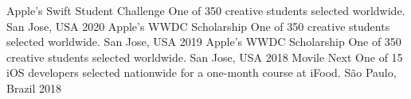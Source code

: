 \begin{cvhonors}
  \cvhonor
    {Apple's Swift Student Challenge}
    {One of 350 creative students selected worldwide.}
    {San Jose, USA}
    {2020}
  \cvhonor
    {Apple's WWDC Scholarship}
    {One of 350 creative students selected worldwide.}
    {San Jose, USA}
    {2019}
  \cvhonor
    {Apple's WWDC Scholarship}
    {One of 350 creative students selected worldwide.}
    {San Jose, USA}
    {2018}
  \cvhonor
    {Movile Next}
    {One of 15 iOS developers selected nationwide for a one-month course at iFood.}
    {São Paulo, Brazil}
    {2018}
\end{cvhonors}
